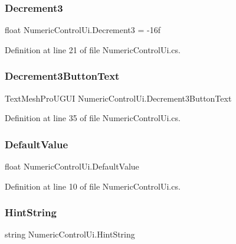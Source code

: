 \subsubsection{\texorpdfstring{Decrement3}{Decrement3}}
{\footnotesize\ttfamily float Numeric\+Control\+Ui.\+Decrement3 = -\/16f}



Definition at line 21 of file Numeric\+Control\+Ui.\+cs.

\mbox{\label{class_numeric_control_ui_aa929f1c88082d2d13f871a1771f88b36}} 
\subsubsection{\texorpdfstring{Decrement3ButtonText}{Decrement3ButtonText}}
{\footnotesize\ttfamily Text\+Mesh\+Pro\+U\+G\+UI Numeric\+Control\+Ui.\+Decrement3\+Button\+Text}



Definition at line 35 of file Numeric\+Control\+Ui.\+cs.

\mbox{\label{class_numeric_control_ui_a364ae2a0aac660f08b9a1e11c30f8d1d}} 
\subsubsection{\texorpdfstring{DefaultValue}{DefaultValue}}
{\footnotesize\ttfamily float Numeric\+Control\+Ui.\+Default\+Value}



Definition at line 10 of file Numeric\+Control\+Ui.\+cs.

\mbox{\label{class_numeric_control_ui_a20bd51b0903ca3b98ad639986e510d7a}} 
\subsubsection{\texorpdfstring{HintString}{HintString}}
{\footnotesize\ttfamily string Numeric\+Control\+Ui.\+Hint\+String}



